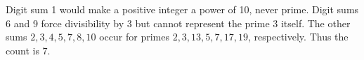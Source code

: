 Digit sum 1 would make a positive integer a power of 10, never prime. Digit sums 6 and 9 force divisibility by 3 but cannot represent the prime 3 itself. The other sums $ 2,3,4,5,7,8,10 $ occur for primes $ 2,3,13,5,7,17,19 $, respectively. Thus the count is $\boxed7 $.
